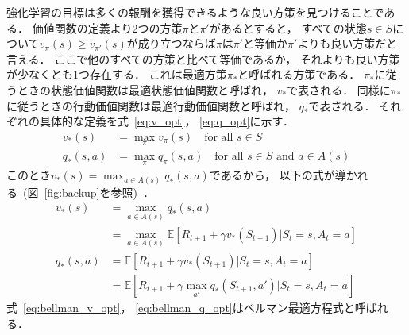 強化学習の目標は多くの報酬を獲得できるような良い方策を見つけることである．
価値関数の定義より2つの方策$\pi$と$\pi'$があるとすると， すべての状態$s \in S$について$v_\pi(s) \geq v_{\pi'}(s)$が成り立つならば$\pi$は$\pi'$と等価か$\pi'$よりも良い方策だと言える．
ここで他のすべての方策と比べて等価であるか， それよりも良い方策が少なくとも$1$つ存在する．
これは最適方策$\pi_*$と呼ばれる方策である．
$\pi_*$に従うときの状態価値関数は最適状態価値関数と呼ばれ， $v_*$で表される．
同様に$\pi_*$に従うときの行動価値関数は最適行動価値関数と呼ばれ， $q_*$で表される．
それぞれの具体的な定義を式~\ref{eq:v_opt}， \ref{eq:q_opt}に示す．
\begin{align}
  \label{eq:v_opt}
  v_*(s) &= \max_\pi v_{\pi}(s) \quad \text{for all } s \in S \\
  \label{eq:q_opt}
  q_*(s,a) &= \max_\pi q_{\pi}(s, a) \quad \text{for all } s \in S \text{ and } a \in A(s)
\end{align}
このとき$v_*(s) = \max_{a \in A(s)} q_*(s, a)$であるから， 以下の式が導かれる~(図~\ref{fig:backup}を参照)~．
\begin{align}
  v_*(s) &= \max_{a \in A(s)} q_*(s, a) \\
  \label{eq:bellman_v_opt}
               &= \max_{a \in A(s)} \mathbb{E}[R_{t+1} + \gamma v_*(S_{t+1}) | S_t=s, A_t=a] \\
  q_*(s, a) &= \mathbb{E}[R_{t+1} + \gamma v_*(S_{t+1}) | S_t=s, A_t=a] \\
  \label{eq:bellman_q_opt}
                  &= \mathbb{E}[R_{t+1} + \gamma \max_{a'} q_*(S_{t+1}, a') | S_t=s, A_t=a]
\end{align}
式~\ref{eq:bellman_v_opt}， \ref{eq:bellman_q_opt}はベルマン最適方程式と呼ばれる．
